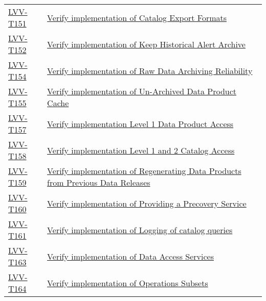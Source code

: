 \begin{longtable}[]{p{3cm}p{13cm}}
\protect\hyperlink{lvv-t151---verify-implementation-of-catalog-export-formats}{LVV-T151}
&
\href{https://jira.lsstcorp.org/secure/Tests.jspa\#/testCase/LVV-T151}{Verify
implementation of Catalog Export Formats}\tabularnewline
\protect\hyperlink{lvv-t152---verify-implementation-of-keep-historical-alert-archive}{LVV-T152}
&
\href{https://jira.lsstcorp.org/secure/Tests.jspa\#/testCase/LVV-T152}{Verify
implementation of Keep Historical Alert Archive}\tabularnewline
\protect\hyperlink{lvv-t154---verify-implementation-of-raw-data-archiving-reliability}{LVV-T154}
&
\href{https://jira.lsstcorp.org/secure/Tests.jspa\#/testCase/LVV-T154}{Verify
implementation of Raw Data Archiving Reliability}\tabularnewline
\protect\hyperlink{lvv-t155---verify-implementation-of-un-archived-data-product-cache}{LVV-T155}
&
\href{https://jira.lsstcorp.org/secure/Tests.jspa\#/testCase/LVV-T155}{Verify
implementation of Un-Archived Data Product Cache}\tabularnewline
\protect\hyperlink{lvv-t157---verify-implementation-level-1-data-product-access}{LVV-T157}
&
\href{https://jira.lsstcorp.org/secure/Tests.jspa\#/testCase/LVV-T157}{Verify
implementation Level 1 Data Product Access}\tabularnewline
\protect\hyperlink{lvv-t158---verify-implementation-level-1-and-2-catalog-access}{LVV-T158}
&
\href{https://jira.lsstcorp.org/secure/Tests.jspa\#/testCase/LVV-T158}{Verify
implementation Level 1 and 2 Catalog Access}\tabularnewline
\protect\hyperlink{lvv-t159---verify-implementation-of-regenerating-data-products-from-previous-data-releases}{LVV-T159}
&
\href{https://jira.lsstcorp.org/secure/Tests.jspa\#/testCase/LVV-T159}{Verify
implementation of Regenerating Data Products from Previous Data
Releases}\tabularnewline
\protect\hyperlink{lvv-t160---verify-implementation-of-providing-a-precovery-service}{LVV-T160}
&
\href{https://jira.lsstcorp.org/secure/Tests.jspa\#/testCase/LVV-T160}{Verify
implementation of Providing a Precovery Service}\tabularnewline
\protect\hyperlink{lvv-t161---verify-implementation-of-logging-of-catalog-queries}{LVV-T161}
&
\href{https://jira.lsstcorp.org/secure/Tests.jspa\#/testCase/LVV-T161}{Verify
implementation of Logging of catalog queries}\tabularnewline
\protect\hyperlink{lvv-t163---verify-implementation-of-data-access-services}{LVV-T163}
&
\href{https://jira.lsstcorp.org/secure/Tests.jspa\#/testCase/LVV-T163}{Verify
implementation of Data Access Services}\tabularnewline
\protect\hyperlink{lvv-t164---verify-implementation-of-operations-subsets}{LVV-T164}
&
\href{https://jira.lsstcorp.org/secure/Tests.jspa\#/testCase/LVV-T164}{Verify
implementation of Operations Subsets}\tabularnewline

\end{longtable}
